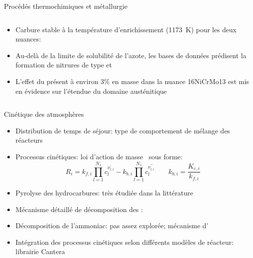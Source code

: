 \documentclass[aspectratio=169,pdf,t]{beamer}
\begin{document}
\begin{frame}{\insertsection}{Procédés thermochimiques et métallurgie}
\begin{columns}[T]
\begin{column}{0.5\textwidth}
\begin{itemize}
            \item \alert<1->{Carbure stable à la température d'enrichissement (\SI{1173}{\kelvin}) pour les deux nuances: }
            \itemskip
            
            \item \alert<1->{Au-delà de la limite de solubilité de l'azote, les bases de données prédisent la formation de nitrures de type  et }
            \itemskip
            
            \item \alert<1->{L'effet du  présent à environ 3\% en masse dans la nuance 16NiCrMo13 est mis en évidence sur l'étendue du domaine austénitique}
          \end{itemize}
		\end{column}
	\end{columns}
\end{frame}


\begin{frame}{\insertsection}{Cinétique des atmosphères}	
	\begin{itemize}
		\def\itemskip{\\[14pt]}
		\item Distribution de temps de séjour: type de comportement de mélange des r\'eacteurs~\cite{Fogler1999,Himmelblau1997}
		\itemskip
		
		\item Processus cinétiques: loi d'action de masse~\cite{Landau1980,Henriksen2008,Tchem2011} sous forme:
    \begin{equation*}
      R_{i}=
      k_{f,i}\prod_{l=1}^{N_{s}}c_{l}^{\nu_{l,i}^{\prime}}-
      k_{b,i}\prod_{l=1}^{N_{s}}c_{l}^{\nu_{l,i}^{\prime\prime}}
      \qquad{}
      k_{b,i}=\frac{K_{c,i}}{k_{f,i}}
    \end{equation*}

		\item Pyrolyse des hydrocarbures: tr\`es \'etudiée dans la littérature~\cite{Norinaga2005,Norinaga2007,Norinaga2007ii,Norinaga2009,Ziegler2005107,Ziegler2005212,Ziegler2005231,Ziegler2005a,Ziegler2007268,Ziegler201348,Benzinger1996957,Becker1998177,Becker1998201,Becker1998213,Becker1998225,Khan2008,Graf2007}
		\itemskip
		
		\item Mécanisme détaillé de décomposition des : \citet{Norinaga2009}
		\itemskip
		
		\item Décomposition de l'ammoniac: pas assez explorée; mécanisme d'\citet{Odochian2011}
		\itemskip
		
		\item Intégration des processus cinétiques selon différents modèles de réacteur: librairie Cantera~\cite{Cantera2014}
	\end{itemize}
\end{frame}
\end{document}
